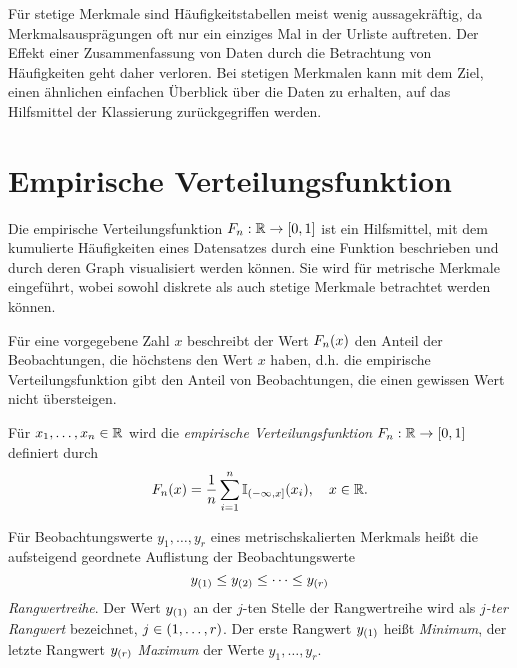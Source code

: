 \documentclass{lecture}
\begin{document}
    Für stetige Merkmale sind Häufigkeitstabellen meist wenig aussagekräftig, da Merkmalsausprägungen oft nur ein einziges Mal in der Urliste auftreten.
    Der Effekt einer Zusammenfassung von Daten durch die Betrachtung von Häufigkeiten geht daher verloren.
    Bei stetigen Merkmalen kann mit dem Ziel, einen ähnlichen einfachen Überblick über die Daten zu erhalten, auf das Hilfsmittel der Klassierung zurückgegriffen werden.


    \section*{Empirische Verteilungsfunktion}

    Die empirische Verteilungsfunktion \(F_n: \R \to \brackets*{0, 1}\) ist ein Hilfsmittel, mit dem kumulierte Häufigkeiten eines Datensatzes durch eine Funktion beschrieben und durch deren Graph visualisiert werden können.
    Sie wird für metrische Merkmale eingeführt, wobei sowohl diskrete als auch stetige Merkmale betrachtet werden können.

    Für eine vorgegebene Zahl \(x\) beschreibt der Wert \(F_n\parentheses*{x}\) den Anteil der Beobachtungen, die höchstens den Wert \(x\) haben, d.h. die empirische Verteilungsfunktion gibt den Anteil von Beobachtungen, die einen gewissen Wert nicht übersteigen.

    \begin{definition}
        Für \(x_1, \ldots, x_n \in \R\) wird die \emph{empirische Verteilungsfunktion} \(F_n: \R \to \brackets*{0, 1}\) definiert durch
        \[
            F_n\parentheses*{x} = \frac{1}{n}\sum_{i = 1}^n \mathbb{I}_{\left(-\infty, x\right]}\parentheses*{x_i}, \quad x \in \R.
        \]
    \end{definition}

    \begin{definition}
        Für Beobachtungswerte \(y_1, \ldots, y_r\) eines metrischskalierten Merkmals heißt die aufsteigend geordnete Auflistung der Beobachtungswerte
        \[
            y_{\parentheses*{1}} \le y_{\parentheses*{2}} \le \cdots \le y_{\parentheses*{r}}
        \]
        \emph{Rangwertreihe}.
        Der Wert \(y_{\parentheses*{1}}\) an der \(j\)-ten Stelle der Rangwertreihe wird als \emph{\(j\)-ter Rangwert} bezeichnet, \(j \in \parentheses*{1, \ldots, r}\).
        Der erste Rangwert \(y_{\parentheses*{1}}\) heißt \emph{Minimum}, der letzte Rangwert \(y_{\parentheses*{r}}\) \emph{Maximum} der Werte \(y_1, \ldots, y_r\).
    \end{definition}
\end{document}
